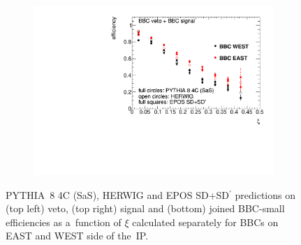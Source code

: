 \begin{figure}[H]
	\begin{subfigure}{.49\textwidth}
		\includegraphics[width=\textwidth,page=1]{chapters/chrgSTAR/img/bbcCorrection/xiSD_bbc.pdf}
	\end{subfigure}
	\hfill
	\begin{minipage}{.47\textwidth}
		\caption{PYTHIA~8 4C (SaS), \mbox{HERWIG} and EPOS SD+SD$^\prime$ predictions on  (top left) veto, (top right) signal and (bottom) joined BBC-small efficiencies  as a~function of  $\xi$ calculated separately for BBCs on EAST and WEST side of the~IP.}
		\label{fig:bbcAcceptance}
	\end{minipage}
	

\end{figure}
